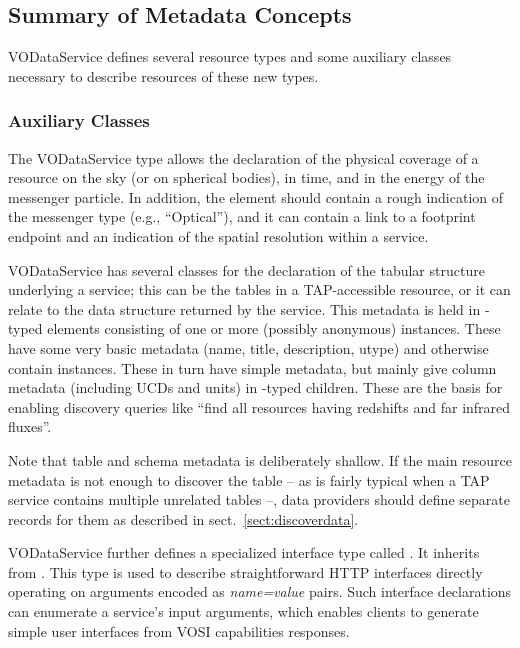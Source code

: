 \documentclass[11pt,a4paper]{ivoa}
\begin{document}
\subsection{Summary of Metadata Concepts}
\label{sect:summ}


VODataService defines several resource types and some auxiliary classes
necessary to describe resources of these new types.

\subsubsection{Auxiliary Classes}

The VODataService type  allows the declaration of
the physical coverage of a resource on the sky (or on spherical bodies),
in time, and in the energy of the messenger particle.  In addition, the
element should contain a rough indication of the messenger type
(e.g., ``Optical''), and it can contain a link to a footprint endpoint and an
indication of the spatial resolution within a service.

VODataService has several classes for the declaration of the tabular
structure underlying a service; this can be the tables in a
TAP-accessible resource,
or it can relate to the data structure returned by the service.  This
metadata is held in
-typed elements consisting
of one or more (possibly anonymous)
 instances.  These have some very basic metadata
(name, title, description, utype) and otherwise contain 
instances.  These in turn have simple metadata, but mainly give column
metadata (including UCDs and units) in -typed
children.  These are the basis for enabling discovery queries like
``find all resources having redshifts and far infrared fluxes''.

Note that table and schema metadata is deliberately shallow.  If the
main resource metadata is not enough to discover the table -- as is
fairly typical when a TAP service contains multiple unrelated tables --,
data providers should define separate records for them as described in
sect.~\ref{sect:discoverdata}.

VODataService further defines a specialized interface type called
.  It inherits from .
This type is used to describe
straightforward HTTP interfaces directly operating on
arguments encoded as
\emph{name=value} pairs.  Such interface declarations can
enumerate a service's input arguments, which enables clients
to generate simple
user interfaces from VOSI capabilities responses.
\end{document}
